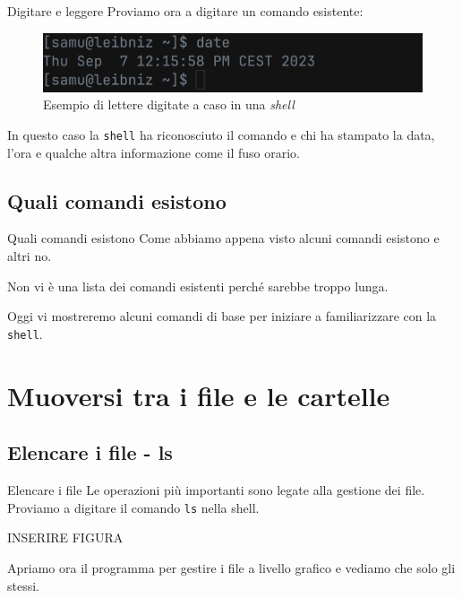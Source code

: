 \documentclass{beamer}
\begin{document}
\begin{frame}{Digitare e leggere}
  Proviamo ora a digitare un comando esistente:
  \begin{figure}
    \includegraphics[width=\textwidth]{assets/date-command.png}
    \caption{Esempio di lettere digitate a caso in una \textit{shell}}
  \end{figure}
  \pause
  In questo caso la \texttt{shell} ha riconosciuto il comando e chi ha stampato
  la data, l'ora e qualche altra informazione come il fuso orario.
\end{frame}

\subsection{Quali comandi esistono}
\begin{frame}{Quali comandi esistono}
  Come abbiamo appena visto alcuni comandi esistono e altri no.\bigskip

  Non vi è una lista dei comandi esistenti perché sarebbe troppo lunga.\bigskip

  Oggi vi mostreremo alcuni comandi di base per iniziare a familiarizzare con la
  \texttt{shell}.
\end{frame}

\section{Muoversi tra i file e le cartelle}

\subsection{Elencare i file - ls}
\begin{frame}{Elencare i file}
  Le operazioni più importanti sono legate alla gestione dei file. Proviamo a 
  digitare il comando \texttt{ls} nella shell.\bigskip

  INSERIRE FIGURA\bigskip

  Apriamo ora il programma per gestire i file a livello grafico e vediamo che
  solo gli stessi.
\end{frame}
\end{document}
